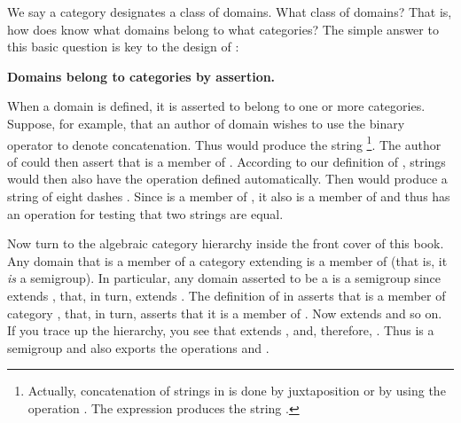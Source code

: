 {{%

We say a category designates a class of domains.
What class of domains?
That is, how does \Language{} know what domains belong to what categories?
The simple answer to this basic question is key to the design of
\Language{}:

\beginImportant
\begin{center}
{\bf Domains belong to categories by assertion.}
\end{center}
\endImportant

When a domain is defined, it is asserted to belong to one or more
categories.
Suppose, for example, that an author of domain  wishes to
use the binary operator \spadop{*} to denote concatenation.
Thus  would produce the string
\footnote{Actually, concatenation of strings in
\Language{} is done by juxtaposition or by using the operation
.
The expression  produces the string
.}.
The author of  could then assert that 
is a member of .
According to our definition of , strings
would then also have the operation \spadop{^} defined automatically.
Then  would produce a string of eight dashes
.
Since  is a member of , it also is
a member of  and thus has an operation
\spadop{=} for testing that two strings are equal.

  Now turn to the algebraic category hierarchy inside the front cover
  of this book.
Any domain that is a member of a
category extending  is a member of
 (that is, it {\it is} a semigroup).
In particular, any domain asserted to be a  is a
semigroup since  extends , that,
in turn, extends .
The definition of  in \Language{} asserts that
 is a member of category
, that, in turn, asserts that it is
a member of .
Now  extends
 and so on.
If you trace up the hierarchy, you see that
 extends , and,
therefore, .
Thus  is a semigroup and also exports the
operations \spadop{*} and \spadop{^}.

}}
